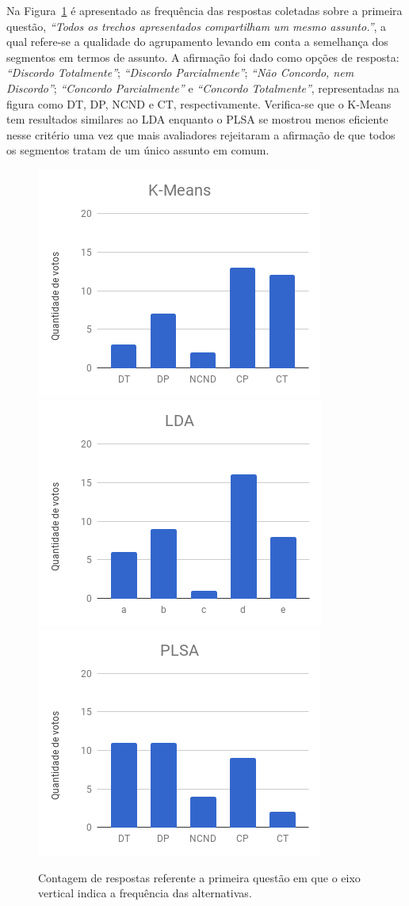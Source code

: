 Na Figura~\ref{fig:Q1} é apresentado as frequência das respostas coletadas sobre a primeira questão, \textit{``Todos os trechos apresentados compartilham um mesmo assunto.''}, a qual refere-se a qualidade do agrupamento levando em conta a semelhança dos segmentos em termos de assunto. A afirmação foi dado como opções de resposta: 
\textit{``Discordo Totalmente''}; 
\textit{``Discordo Parcialmente''}; 
\textit{``Não Concordo, nem Discordo''}; 
\textit{``Concordo Parcialmente''} e 
\textit{``Concordo Totalmente''}, 
representadas na figura como DT, DP, NCND e CT, respectivamente.
Verifica-se que o K-Means tem resultados similares ao LDA enquanto o PLSA se mostrou menos eficiente nesse critério uma vez que mais avaliadores rejeitaram a afirmação de que todos os segmentos tratam de um único assunto em comum. 

\begin{figure}[!h] \centering     %
		\includegraphics[width=.31\textwidth]{conteudo/capitulos/figs/figuras-experimento/Q1-KMeans.png}
		\includegraphics[width=.31\textwidth]{conteudo/capitulos/figs/figuras-experimento/Q1-LDA.png}
		\includegraphics[width=.31\textwidth]{conteudo/capitulos/figs/figuras-experimento/Q1-PLSA.png}
	\caption{Contagem de respostas referente a primeira questão em que o eixo vertical indica a frequência das alternativas.  }
	\label{fig:Q1}
\end{figure}

